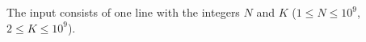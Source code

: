 

The input consists of one line with the integers $N$ and $K$ ($1 \leq N \leq 10^9$, $2 \leq K \leq 10^9$).

